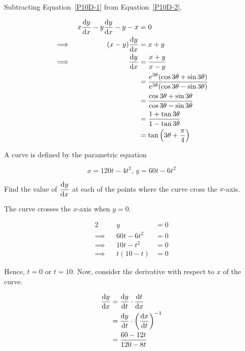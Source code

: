\documentclass{echw}
\begin{document}
            Subtracting Equation~\ref{P10D-1} from Equation~\ref{P10D-2}, 

            \begin{alignat*}{2}
                &&x\dfrac{\mathrm{d} y}{\mathrm{d} x} - y \dfrac{\mathrm{d} y}{\mathrm{d} x} - y - x &= 0\\
                \implies&&(x-y)\dfrac{\mathrm{d} y}{\mathrm{d} x} &= x+y\\
                \implies&&\dfrac{\mathrm{d} y}{\mathrm{d} x} &= \dfrac{x+y}{x-y}\\
                && &= \dfrac{e^{3\theta}(\cos 3\theta + \sin 3\theta)}{e^{3\theta}(\cos 3\theta - \sin 3\theta)}\\
                && &= \dfrac{\cos 3\theta + \sin 3\theta}{\cos 3\theta - \sin 3\theta}\\
                && &= \dfrac{1 + \tan 3\theta}{1 - \tan 3\theta}\\
                && &= \tan\left(3\theta + \dfrac{\pi}4\right)
            \end{alignat*}


    \problem{}
        A curve is defined by the parametric equation

        \begin{equation*}
            x = 120t - 4t^2, \, y = 60t - 6t^2
        \end{equation*}

        Find the value of $\dfrac{\mathrm{d} y}{\mathrm{d} x}$ at each of the points where the curve cross the $x$-axis.

    \solution
        The curve crosses the $x$-axis when $y=0$.

        \begin{alignat*}{2}
            &&y &= 0\\
            \implies&&60t-6t^2 &= 0\\
            \implies&&10t-t^2 &= 0\\
            \implies&&t(10 - t) &= 0
        \end{alignat*}

        Hence, $t = 0$ or $t = 10$. Now, consider the derivative with respect to $x$ of the curve.

        \begin{align*}
            \dfrac{\mathrm{d} y}{\mathrm{d} x} &= \dfrac{\mathrm{d} y}{\mathrm{d} t} \cdot \dfrac{\mathrm{d} t}{\mathrm{d} x}\\
            &= \dfrac{\mathrm{d} y}{\mathrm{d} t} \cdot \left(\dfrac{\mathrm{d} x}{\mathrm{d} t}\right)^{-1}\\
            &= \dfrac{60 - 12t}{120 - 8t}
        \end{align*}
\end{document}
